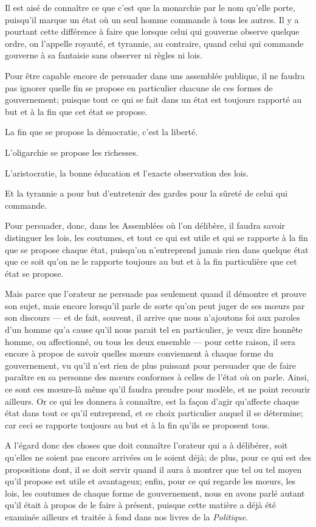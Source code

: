Il est aisé de connaître ce que c'est que la monarchie par le nom qu'elle porte, puisqu'il marque un état où
un seul homme commande à tous les autres. Il y a pourtant cette différence à faire que lorsque celui qui
gouverne observe quelque ordre, on l'appelle royauté, et tyrannie, au contraire, quand celui qui commande
gouverne à sa fantaisie sans observer ni règles ni lois.

Pour être capable encore de persuader dans uns assemblée publique, il ne faudra pas ignorer quelle fin se
propose en particulier chacune de ces formes de gouvernement; puisque tout ce qui se fait dans un état est
toujours rapporté au but et à la fin que cet état se propose.

La fin que se propose la démocratie, c'est la liberté. 

L'oligarchie se propose les richesses. 

L'aristocratie, la bonne éducation et l'exacte observation des lois. 

Et la tyrannie a pour but d’entretenir des gardes pour la sûreté de celui qui commande.

Pour persuader, donc, dans les Assemblées où l'on délibère, il faudra savoir distinguer les lois, les coutumes,
et tout ce qui est utile et qui se rapporte à la fin que se propose chaque état, puisqu'on n'entreprend jamais
rien dans quelque état que ce soit qu'on ne le rapporte toujours au but et à la fin particulière que cet état
se propose.

\bigbreak

Mais parce que l'orateur ne persuade pas seulement quand il démontre et prouve son sujet, mais encore lorsqu'il
parle de sorte qu'on peut juger de ses mœurs par son discours --- et de fait, souvent, il arrive que nous n'ajoutons
foi aux paroles d'un homme qu'a cause qu'il nous parait tel en particulier, je veux dire honnête homme, ou affectionné,
ou tous les deux ensemble --- pour cette raison, il sera encore à propos de savoir quelles mœurs conviennent à chaque
forme du gouvernement, vu qu'il n'est rien de plus puissant pour persuader que de faire paraître en sa personne des mœurs
conformes à celles de l'état où on parle. Ainsi, ce sont ces mœurs-là même qu'il faudra prendre pour modèle, et ne point
recourir ailleurs. Or ce qui les donnera à connaître, est la façon d'agir qu'affecte chaque état dans tout ce qu'il
entreprend, et ce choix particulier auquel il se détermine; car ceci se rapporte toujours au but et à la fin qu'ils se
proposent tous.

\bigbreak

A l’égard donc des choses que doit connaître l'orateur qui a à délibérer, soit qu'elles ne soient pas encore arrivées
ou le soient déjà; de plus, pour ce qui est des propositions dont, il se doit servir quand il aura à montrer que tel ou
tel moyen qu'il propose est utile et avantageux; enfin, pour ce qui regarde les mœurs, les lois, les coutumes de chaque
forme de gouvernement, nous en avons parlé autant qu'il était à propos de le faire à présent, puisque cette matière a
déjà été examinée ailleurs et traitée à fond dans nos livres de la \emph{Politique}.
